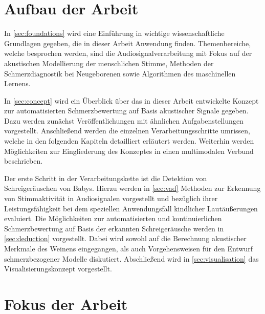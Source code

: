 
\section{Aufbau der Arbeit}

In \autoref{sec:foundations} wird eine Einführung in wichtige wissenschaftliche Grundlagen gegeben, die in dieser Arbeit Anwendung finden. Themenbereiche, welche besprochen werden, sind die Audiosignalverarbeitung mit Fokus auf der akustischen Modellierung der menschlichen Stimme, Methoden der Schmerzdiagnostik bei Neugeborenen sowie Algorithmen des maschinellen Lernens. 

In \autoref{sec:concept} wird ein Überblick über das in dieser Arbeit entwickelte Konzept zur automatisierten Schmerzbewertung auf Basis akustischer Signale gegeben. Dazu werden zunächst Veröffentlichungen mit ähnlichen Aufgabenstellungen vorgestellt. Anschließend werden die einzelnen Verarbeitungsschritte umrissen, welche in den folgenden Kapiteln detailliert erläutert werden. Weiterhin werden Möglichkeiten zur Eingliederung des Konzeptes in einen multimodalen Verbund beschrieben.

Der erste Schritt in der Verarbeitungskette ist die Detektion von Schreigeräuschen von Babys. Hierzu werden in \autoref{sec:vad} Methoden zur Erkennung von Stimmaktivität in Audiosignalen vorgestellt und bezüglich ihrer Leistungsfähigkeit bei dem speziellen Anwendungsfall kindlicher Lautäußerungen evaluiert. Die Möglichkeiten zur automatisierten und kontinuierlichen Schmerzbewertung auf Basis der erkannten Schreigeräusche werden in \autoref{sec:deduction} vorgestellt. Dabei wird sowohl auf die Berechnung akustischer Merkmale des Weinens eingegangen, als auch Vorgehensweisen für den Entwurf schmerzbezogener Modelle diskutiert. Abschließend wird in \autoref{sec:visualisation} das Visualisierungskonzept vorgestellt.

\section{Fokus der Arbeit}

